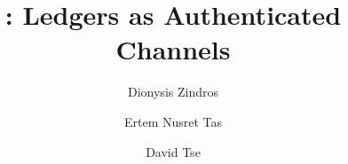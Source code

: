 \title{
  \rollerblade:
  Ledgers as Authenticated Channels
}
\ifanonymous{\iflncs
\author{}\institute{}
\fi}
\else
\author{
  Dionysis Zindros\and
  Ertem Nusret Tas\and
  David Tse
}
\iflncs
{}
\else
{}
\fi
\fi
